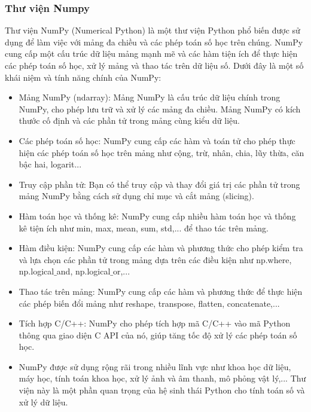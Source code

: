 \subsubsection{Thư viện Numpy}
Thư viện NumPy (Numerical Python) là một thư viện Python phổ biến được sử dụng để làm việc với mảng đa chiều và các phép toán số học trên chúng. NumPy cung cấp một cấu trúc dữ liệu mảng mạnh mẽ và các hàm tiện ích để thực hiện các phép toán số học, xử lý mảng và thao tác trên dữ liệu số.
Dưới đây là một số khái niệm và tính năng chính của NumPy:
\begin{itemize}
	\item Mảng NumPy (ndarray): Mảng NumPy là cấu trúc dữ liệu chính trong NumPy, cho phép lưu trữ và xử lý các mảng đa chiều. Mảng NumPy có kích thước cố định và các phần tử trong mảng cùng kiểu dữ liệu.
	
	\item Các phép toán số học: NumPy cung cấp các hàm và toán tử cho phép thực hiện các phép toán số học trên mảng như cộng, trừ, nhân, chia, lũy thừa, căn bậc hai, logarit...
	
	\item Truy cập phần tử: Bạn có thể truy cập và thay đổi giá trị các phần tử trong mảng NumPy bằng cách sử dụng chỉ mục và cắt mảng (slicing).
	
	\item Hàm toán học và thống kê: NumPy cung cấp nhiều hàm toán học và thống kê tiện ích như min, max, mean, sum, std,... để thao tác trên mảng.
	
	\item Hàm điều kiện: NumPy cung cấp các hàm và phương thức cho phép kiểm tra và lựa chọn các phần tử trong mảng dựa trên các điều kiện như np.where, np.logical$\_$and, np.logical$\_$or,...
	
	\item Thao tác trên mảng: NumPy cung cấp các hàm và phương thức để thực hiện các phép biến đổi mảng như reshape, transpose, flatten, concatenate,...
	
	\item Tích hợp C/C++: NumPy cho phép tích hợp mã C/C++ vào mã Python thông qua giao diện C API của nó, giúp tăng tốc độ xử lý các phép toán số học.
	
	\item NumPy được sử dụng rộng rãi trong nhiều lĩnh vực như khoa học dữ liệu, máy học, tính toán khoa học, xử lý ảnh và âm thanh, mô phỏng vật lý,... Thư viện này là một phần quan trọng của hệ sinh thái Python cho tính toán số và xử lý dữ liệu.
\end{itemize}

